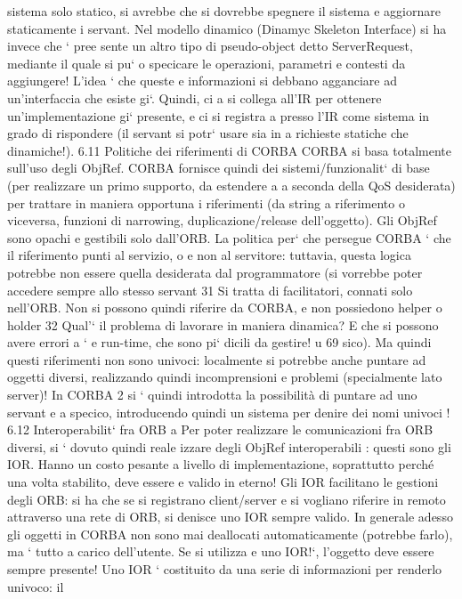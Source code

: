 \documentclass[a4paper,12pt]{article}
\begin{document}
sistema solo statico, si avrebbe che si
dovrebbe spegnere il sistema e aggiornare staticamente i servant.
Nel modello dinamico (Dinamyc Skeleton Interface) si ha invece che ` pree
sente un altro tipo di pseudo-object detto ServerRequest, mediante il quale si pu`
o
specicare le operazioni, parametri e contesti da aggiungere! L'idea ` che queste
e
informazioni si debbano agganciare ad un'interfaccia che esiste gi`. Quindi, ci
a
si collega all'IR per ottenere un'implementazione gi` presente, e ci si registra
a
presso l'IR come sistema in grado di rispondere (il servant si potr` usare sia in
a
richieste statiche che dinamiche!).
6.11
Politiche dei riferimenti di CORBA
CORBA si basa totalmente sull'uso degli ObjRef. CORBA fornisce quindi dei
sistemi/funzionalit` di base (per realizzare un primo supporto, da estendere a
a
seconda della QoS desiderata) per trattare in maniera opportuna i riferimenti
(da string a riferimento o viceversa, funzioni di narrowing, duplicazione/release
dell'oggetto). Gli ObjRef sono opachi e gestibili solo dall'ORB.
La politica per` che persegue CORBA ` che il riferimento punti al servizio,
o
e
non al servitore: tuttavia, questa logica potrebbe non essere quella desiderata dal programmatore (si vorrebbe poter
accedere sempre allo stesso servant
31 Si tratta di facilitatori, connati solo nell'ORB. Non si possono quindi riferire da CORBA,
e non possiedono helper o holder
32 Qual'` il problema di lavorare in maniera dinamica? E che si possono avere errori a
`
e
run-time, che sono pi` dicili da gestire!
u
69
\newpage
sico). Ma quindi questi riferimenti non sono univoci: localmente si potrebbe
anche puntare ad oggetti diversi, realizzando quindi incomprensioni e problemi
(specialmente lato server)!
In CORBA 2 si ` quindi introdotta la possibilità di puntare ad uno servant
e
a
specico, introducendo quindi un sistema per denire dei nomi univoci !
6.12
Interoperabilit` fra ORB
a
Per poter realizzare le comunicazioni fra ORB diversi, si ` dovuto quindi reale
izzare degli ObjRef interoperabili : questi sono gli IOR. Hanno un costo pesante
a livello di implementazione, soprattutto perché una volta stabilito, deve essere
e
valido in eterno!
Gli IOR facilitano le gestioni degli ORB: si ha che se si registrano client/server
e si vogliano riferire in remoto attraverso una rete di ORB, si denisce uno IOR
sempre valido. In generale adesso gli oggetti in CORBA non sono mai deallocati
automaticamente (potrebbe farlo), ma ` tutto a carico dell'utente. Se si utilizza
e
uno IOR!`, l'oggetto deve essere sempre presente!
Uno IOR ` costituito da una serie di informazioni per renderlo univoco: il
\end{document}
